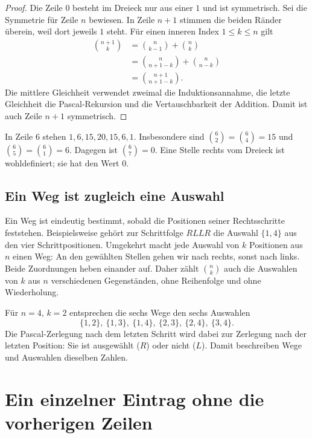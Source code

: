 \begin{proof}
Die Zeile $0$ besteht im Dreieck nur aus einer $1$ und ist symmetrisch.
Sei die Symmetrie für Zeile $n$ bewiesen. In Zeile $n+1$ stimmen
die beiden Ränder überein, weil dort jeweils $1$ steht.
Für einen inneren Index $1\le k\le n$ gilt
\[
 \begin{aligned}
 \binom{n+1}k
 &=\binom n{k-1}+\binom nk\\
 &=\binom n{n+1-k}+\binom n{n-k}\\
 &=\binom{n+1}{n+1-k}.
 \end{aligned}
\]
Die mittlere Gleichheit verwendet zweimal die Induktionsannahme,
die letzte Gleichheit die Pascal-Rekursion und die Vertauschbarkeit
der Addition. Damit ist auch Zeile $n+1$ symmetrisch.
\end{proof}

\begin{beispiel}
In Zeile $6$ stehen $1,6,15,20,15,6,1$. Insbesondere sind
$\binom62=\binom64=15$ und $\binom65=\binom61=6$.
Dagegen ist $\binom67=0$. Eine Stelle rechts vom Dreieck ist
wohldefiniert; sie hat den Wert $0$.
\end{beispiel}

\subsection{Ein Weg ist zugleich eine Auswahl}
\label{bin:selection}

Ein Weg ist eindeutig bestimmt, sobald die Positionen seiner
Rechtsschritte feststehen. Beispielsweise gehört zur Schrittfolge
$RLLR$ die Auswahl $\{1,4\}$ aus den vier Schrittpositionen.
Umgekehrt macht jede Auswahl von $k$ Positionen aus $n$ einen Weg:
An den gewählten Stellen gehen wir nach rechts, sonst nach links.
Beide Zuordnungen heben einander auf. Daher zählt $\binom nk$ auch
die Auswahlen von $k$ aus $n$ verschiedenen Gegenständen, ohne
Reihenfolge und ohne Wiederholung.

Für $n=4$, $k=2$ entsprechen die sechs Wege den sechs Auswahlen
\[
 \{1,2\},\ \{1,3\},\ \{1,4\},\ \{2,3\},\ \{2,4\},\ \{3,4\}.
\]
Die Pascal-Zerlegung nach dem letzten Schritt wird dabei zur Zerlegung
nach der letzten Position: Sie ist ausgewählt ($R$) oder nicht ($L$).
Damit beschreiben Wege und Auswahlen dieselben Zahlen.

\section{Ein einzelner Eintrag ohne die vorherigen Zeilen}
\label{bin:factorials}

